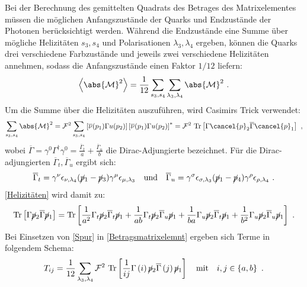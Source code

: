Bei der Berechnung des gemittelten Quadrats des Betrages des Matrixelementes müssen die möglichen Anfangszustände der Quarks und Endzustände der Photonen berücksichtigt werden. Während die Endzustände eine Summe über mögliche Helizitäten $s_3, s_4$ und Polarisationen $\lambda_3, \lambda_4$ ergeben, können die Quarks drei verschiedene Farbzustände und jeweils zwei verschiedene Helizitäten annehmen, sodass die Anfangszustände einen Faktor $1/12$ liefern:
\begin{equation}
\left\langle  \abs{\mathcal{M}}^2\right\rangle = \frac{1}{12} \sum_{s_3, s_4} \sum_{\lambda_3, \lambda_4} \abs{\mathcal{M}}^2~.
\label{Betragsmatrixelemnt}
\end{equation}
Um die Summe über die Helizitäten auszuführen, wird Casimirs Trick verwendet:
\begin{equation}
\sum_{s_3, s_4} \abs{\mathcal{M}}^2 = \mathcal{F}^2 \sum_{s_3, s_4}  \left[ \overline{\nu}(p_1) \Gamma u(p_2)\right] \left[\overline{\nu}(p_1) \Gamma u(p_2)\right]^* = \mathcal{F}^2~\text{Tr}\left[ \Gamma \cancel{p}_2 \overline{\Gamma} \cancel{p}_1 \right] ~,
\label{Helizitäten}
\end{equation}
wobei $\overline{\Gamma} = \gamma^0\Gamma^\dagger\gamma^0 = \frac{\overline{\Gamma}_t}{a} + \frac{\overline{\Gamma}_u}{b}$ die Dirac-Adjungierte bezeichnet. Für die Dirac-adjungierten $\overline{\Gamma}_t, \overline{\Gamma}_u$ ergibt sich:
\begin{equation}
\overline{\Gamma}_t = \gamma^\nu  \epsilon_{\nu, \lambda_4} (\cancel{p}_1- \cancel{p}_3)  \gamma^\mu \epsilon_{\mu, \lambda_3} \quad \text{und} \quad \overline{\Gamma}_u = \gamma^\sigma \epsilon_{\sigma, \lambda_3} (\cancel{p}_1- \cancel{p}_4)  \gamma^\rho \epsilon_{\rho, \lambda_4} ~.
\end{equation}
\textsf{\autoref{Helizitäten}} wird damit zu:
\begin{equation}
\text{Tr}\left[ \Gamma \cancel{p}_2 \overline{\Gamma} \cancel{p}_1 \right] = \text{Tr}\left[\frac{1}{a^2} \Gamma_t \cancel{p}_2 \overline{\Gamma}_t \cancel{p}_1 + \frac{1}{ab} \Gamma_t \cancel{p}_2 \overline{\Gamma}_u \cancel{p}_1 + \frac{1}{ba} \Gamma_u \cancel{p}_2 \overline{\Gamma}_t \cancel{p}_1 + \frac{1}{b^2} \Gamma_u \cancel{p}_2 \overline{\Gamma}_u \cancel{p}_1\right]~.
\label{Spur}
\end{equation}
Bei Einsetzen von \textsf{\autoref{Spur}} in \textsf{\autoref{Betragsmatrixelemnt}} ergeben sich Terme in folgendem Schema:
\begin{equation}
T_{ij} = \frac{1}{12} \sum_{\lambda_3, \lambda_4} \mathcal{F}^2~\text{Tr}\left[ \frac{1}{ij} \Gamma\left(i\right) \cancel{p}_2 \overline{\Gamma}\left(j\right) \cancel{p}_1 \right] \quad \text{mit} \quad i,j \in \left\lbrace a,b\right\rbrace~.
\end{equation}
